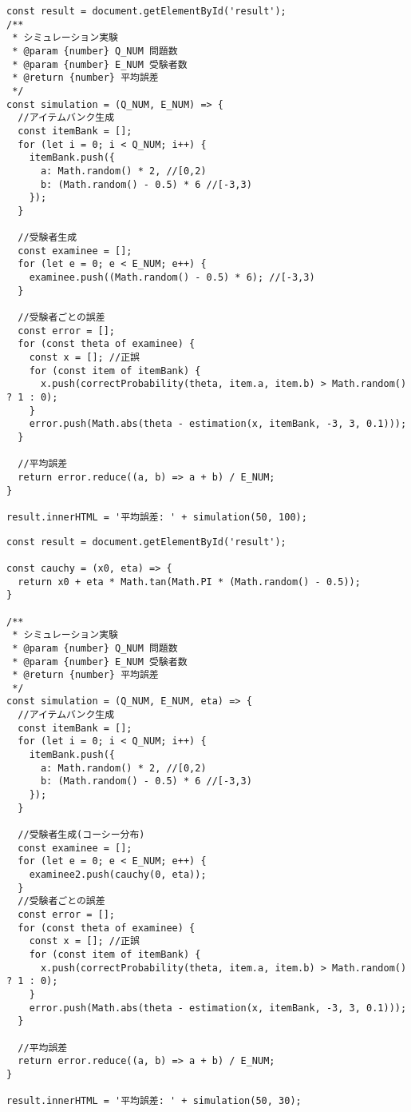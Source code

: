 \documentclass[12pt]{jarticle}
\begin{document}
\begin{lstlisting}[style=JavaScript, caption={課題1-1}]
const result = document.getElementById('result');
/**
 * シミュレーション実験
 * @param {number} Q_NUM 問題数
 * @param {number} E_NUM 受験者数
 * @return {number} 平均誤差
 */
const simulation = (Q_NUM, E_NUM) => {
  //アイテムバンク生成
  const itemBank = [];
  for (let i = 0; i < Q_NUM; i++) {
    itemBank.push({
      a: Math.random() * 2, //[0,2)
      b: (Math.random() - 0.5) * 6 //[-3,3)
    });
  }

  //受験者生成
  const examinee = [];
  for (let e = 0; e < E_NUM; e++) {
    examinee.push((Math.random() - 0.5) * 6); //[-3,3)
  }

  //受験者ごとの誤差
  const error = [];
  for (const theta of examinee) {
    const x = []; //正誤
    for (const item of itemBank) {
      x.push(correctProbability(theta, item.a, item.b) > Math.random() ? 1 : 0);
    }
    error.push(Math.abs(theta - estimation(x, itemBank, -3, 3, 0.1)));
  }

  //平均誤差
  return error.reduce((a, b) => a + b) / E_NUM;
}

result.innerHTML = '平均誤差: ' + simulation(50, 100);
\end{lstlisting}
\begin{lstlisting}[style=JavaScript, caption={課題1-2}]
const result = document.getElementById('result');

const cauchy = (x0, eta) => {
  return x0 + eta * Math.tan(Math.PI * (Math.random() - 0.5));
}

/**
 * シミュレーション実験
 * @param {number} Q_NUM 問題数
 * @param {number} E_NUM 受験者数
 * @return {number} 平均誤差
 */
const simulation = (Q_NUM, E_NUM, eta) => {
  //アイテムバンク生成
  const itemBank = [];
  for (let i = 0; i < Q_NUM; i++) {
    itemBank.push({
      a: Math.random() * 2, //[0,2)
      b: (Math.random() - 0.5) * 6 //[-3,3)
    });
  }

  //受験者生成(コーシー分布)
  const examinee = [];
  for (let e = 0; e < E_NUM; e++) {
    examinee2.push(cauchy(0, eta));
  }
  //受験者ごとの誤差
  const error = [];
  for (const theta of examinee) {
    const x = []; //正誤
    for (const item of itemBank) {
      x.push(correctProbability(theta, item.a, item.b) > Math.random() ? 1 : 0);
    }
    error.push(Math.abs(theta - estimation(x, itemBank, -3, 3, 0.1)));
  }

  //平均誤差
  return error.reduce((a, b) => a + b) / E_NUM;
}

result.innerHTML = '平均誤差: ' + simulation(50, 30);
\end{lstlisting}
\end{document}
